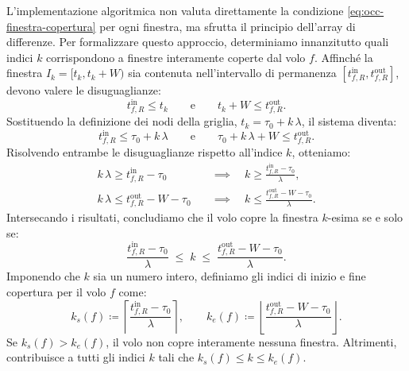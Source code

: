     
    
    L'implementazione algoritmica non valuta direttamente la condizione \eqref{eq:occ-finestra-copertura} per ogni finestra, ma sfrutta il principio dell'array di differenze. Per formalizzare questo approccio, determiniamo innanzitutto quali indici \(k\) corrispondono a finestre interamente coperte dal volo \(f\).
Affinché la finestra \(I_k = [t_k, t_k+W)\) sia contenuta nell'intervallo di permanenza \([t^{\mathrm{in}}_{f,R}, t^{\mathrm{out}}_{f,R}]\), devono valere le disuguaglianze:
\begin{equation*}
    t^{\mathrm{in}}_{f,R} \le t_k 
    \qquad\text{e}\qquad 
    t_k + W \le t^{\mathrm{out}}_{f,R}.
\end{equation*}
Sostituendo la definizione dei nodi della griglia, \(t_k = \tau_0 + k\,\lambda\), il sistema diventa:
\begin{equation*}
    t^{\mathrm{in}}_{f,R} \le \tau_0 + k\,\lambda
    \qquad\text{e}\qquad
    \tau_0 + k\,\lambda + W \le t^{\mathrm{out}}_{f,R}.
\end{equation*}
Risolvendo entrambe le disuguaglianze rispetto all'indice \(k\), otteniamo:
\begin{align*}
    k\,\lambda \ge t^{\mathrm{in}}_{f,R} - \tau_0 
    \quad&\implies\quad
    k \ge \frac{t^{\mathrm{in}}_{f,R} - \tau_0}{\lambda}, \\[1ex]
    k\,\lambda \le t^{\mathrm{out}}_{f,R} - W - \tau_0 
    \quad&\implies\quad
    k \le \frac{t^{\mathrm{out}}_{f,R} - W - \tau_0}{\lambda}.
\end{align*}
Intersecando i risultati, concludiamo che il volo copre la finestra \(k\)-esima se e solo se:
\begin{equation*}
    \frac{t^{\mathrm{in}}_{f,R} - \tau_0}{\lambda} 
    \;\le\; k \;\le\;
    \frac{t^{\mathrm{out}}_{f,R} - W - \tau_0}{\lambda}.
\end{equation*}
Imponendo che \(k\) sia un numero intero, definiamo gli indici di inizio e fine copertura per il volo \(f\) come:
\begin{equation}
    \label{eq:indices-def}
    k_s(f) \coloneqq 
    \left\lceil \frac{t^{\mathrm{in}}_{f,R} - \tau_0}{\lambda} \right\rceil,
    \qquad
    k_e(f) \coloneqq 
    \left\lfloor \frac{t^{\mathrm{out}}_{f,R} - W - \tau_0}{\lambda} \right\rfloor.
\end{equation}
Se \(k_s(f) > k_e(f)\), il volo non copre interamente nessuna finestra. Altrimenti, contribuisce a tutti gli indici \(k\) tali che \(k_s(f) \le k \le k_e(f)\).
